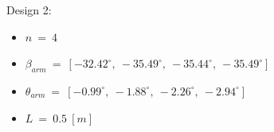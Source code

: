 Design 2:
\begin{itemize}
  \item $n\ =\ 4$
  \item $\beta_{arm}\ =\ [-32.42^{\circ},\  -35.49^{\circ},\  -35.44^{\circ},\  -35.49^{\circ}]$
  \item $\theta_{arm}\ =\ [-0.99^{\circ},\  -1.88^{\circ},\  -2.26^{\circ},\  -2.94^{\circ}]$
  \item $L\ =\ 0.5\ [m]$
\end{itemize}


\begin{figure}[!h]
\end{figure}
